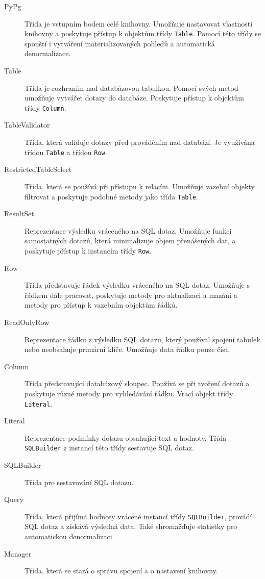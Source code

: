 \documentclass[ing,male,java,dept456]{diploma}						%
\begin{document}
\begin{description}
\item[PyPg] Třída je vstupním bodem celé knihovny. Umožňuje nastavovat vlastnosti knihovny a poskytuje přístup k objektům třídy \lstinline[style=inlinepython]|Table|. Pomocí této třídy se spouští i vytváření materializovaných pohledů a automatická denormalizace.
\item[Table] Třída je rozhraním nad databázovou tabulkou. Pomocí svých metod umožňuje vytvářet dotazy do databáze. Poskytuje přístup k objektům třídy \lstinline[style=inlinepython]|Column|.
\item[TableValidator] Třída, která validuje dotazy před prováděním nad databází. Je využívána třídou \lstinline[style=inlinepython]|Table| a třídou \lstinline[style=inlinepython]|Row|.
\item[RestrictedTableSelect] Třída, která se používá při přístupu k relacím. Umožňuje vazební objekty filtrovat a poskytuje podobné metody jako třída \lstinline[style=inlinepython]|Table|. 
\item[ResultSet] Reprezentace výsledku vráceného na SQL dotaz. Umožňuje funkci samostatných dotazů, která minimalizuje objem přenášených dat, a poskytuje přístup k instancím třídy \lstinline[style=inlinepython]|Row|.
\item[Row] Třída představuje řádek výsledku vráceného na SQL dotaz. Umožňuje s řádkem dále pracovat, poskytuje metody pro aktualizaci a mazání a metody pro přístup k vazebním objektům řádků.
\item[ReadOnlyRow] Reprezentace řádku z výsledku SQL dotazu, který používal spojení tabulek nebo neobsahuje primární klíče. Umožňuje data řádku pouze číst.
\item[Column] Třída představující databázový sloupec. Používá se při tvoření dotazů a poskytuje různé metody pro vyhledávání řádku. Vrací objekt třídy \lstinline[style=inlinepython]|Literal|.
\item[Literal] Reprezentace podmínky dotazu obsahující text a hodnoty. Třída \lstinline[style=inlinepython]|SQLBuilder| z instancí této třídy sestavuje SQL dotaz.
\item[SQLBuilder] Třída pro sestavování SQL dotazu.
\item[Query] Třída, která přijímá hodnoty vrácené instancí třídy \lstinline[style=inlinepython]|SQLBuilder|, provádí SQL dotaz a získává výsledná data. Také shromažďuje statistky pro automatickou denormalizaci.
\item[Manager] Třída, která se stará o správu spojení a o nastavení knihovny.

\end{description}
\end{document}
